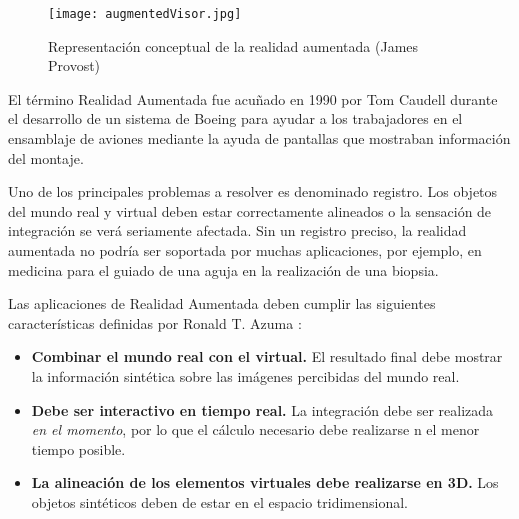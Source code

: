 \begin{figure}[h]
  \centering
  \texttt{[image: augmentedVisor.jpg]}
  \caption{Representación conceptual de la realidad aumentada (James Provost)}
  \label{fig:augmentedVisor}
\end{figure}

El término Realidad Aumentada fue acuñado en 1990 por Tom Caudell durante el desarrollo de un sistema de Boeing para ayudar a los trabajadores en el ensamblaje de aviones mediante la ayuda de pantallas que mostraban información del montaje. 


Uno de los principales problemas a resolver es denominado registro. Los objetos del mundo real y virtual deben estar correctamente alineados o la sensación de integración se verá seriamente afectada. Sin un registro preciso, la realidad aumentada no podría ser soportada por muchas aplicaciones, por ejemplo, en medicina para el guiado de una aguja en la realización de una biopsia. 

Las aplicaciones de Realidad Aumentada deben cumplir las siguientes características definidas por Ronald T. Azuma \cite{Azuma}:
\begin{itemize}
\item \textbf{Combinar el mundo real con el virtual.} El resultado final debe mostrar la información sintética sobre las imágenes percibidas del mundo real.
\item \textbf{Debe ser interactivo en tiempo real.} La integración debe ser realizada \emph{en el momento}, por lo que el cálculo necesario debe realizarse n el menor tiempo posible.
\item \textbf{La alineación de los elementos virtuales debe realizarse en 3D.} Los objetos sintéticos deben de estar en el espacio tridimensional.
\end{itemize}


